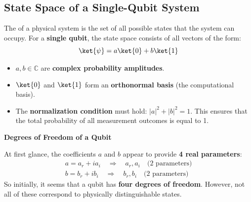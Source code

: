 \subsection{State Space of a Single-Qubit System}\label{sec:state-space-of-a-single-qubit-system}

The  of a physical system is the set of all possible states that the system can occupy. For a \textbf{single qubit}, the state space consists of all vectors of the form:
\begin{equation*}
    \ket{\psi} = a\ket{0} + b\ket{1}
\end{equation*}
\begin{itemize}
    \item $a, b \in \mathbb{C}$ are \textbf{complex probability amplitudes}.
    \item $\ket{0}$ and $\ket{1}$ form an \textbf{orthonormal basis} (the computational basis).
    \item The \textbf{normalization condition} must hold: $\left|a\right|^2 + \left|b\right|^2 = 1$. This ensures that the total probability of all measurement outcomes is equal to 1.
\end{itemize}
\begin{flushleft}
    \textcolor{Green3}{ \textbf{Degrees of Freedom of a Qubit}}
\end{flushleft}
At first glance, the coefficients $a$ and $b$ appear to provide \textbf{4 real parameters}:
\begin{gather*}
    a = a_r + i a_i \quad \Rightarrow \quad a_r, a_i \quad \text{(2 parameters)} \\
    b = b_r + i b_i \quad \Rightarrow \quad b_r, b_i \quad \text{(2 parameters)}
\end{gather*}
So initially, it seems that a qubit has \textbf{four degrees of freedom}. However, not all of these correspond to physically distinguishable states.
